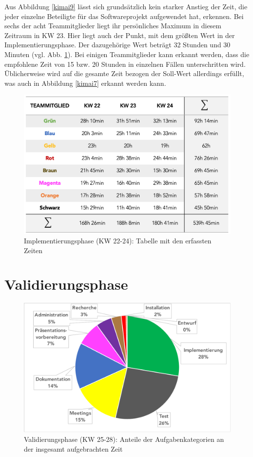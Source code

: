 \documentclass[../review_3.tex]{subfiles}
\begin{document}
Aus Abbildung \ref{kimai9} lässt sich grundsätzlich kein starker Anstieg der Zeit, die jeder einzelne Beteiligte für das Softwareprojekt aufgewendet hat, erkennen. Bei sechs der acht Teammitglieder liegt ihr persönliches Maximum in diesem Zeitraum in KW 23. Hier liegt auch der Punkt, mit dem größten Wert in der Implementierungsphase. Der dazugehörige Wert beträgt 32 Stunden und 30 Minuten (vgl. Abb. \ref{kimai11}).
Bei einigen Teammitglieder kann erkannt werden, dass die empfohlene Zeit von 15 bzw. 20 Stunden in einzelnen Fällen unterschritten wird. Üblicherweise wird auf die gesamte Zeit bezogen der Soll-Wert allerdings erfüllt, was auch in Abbildung \ref{kimai7} erkannt werden kann.

\begin{figure} [h]
    \centering
    \includegraphics[width = 0.8\linewidth]{img/kimai11.png}
    \caption{Implementierungsphase (KW 22-24): Tabelle mit den erfassten Zeiten}
    \label{kimai11}
\end{figure}

\section{Validierungsphase}
\begin{figure} [h]
    \centering
    \includegraphics[width = 0.9\linewidth, trim=10pt 10pt 10pt 2pt, clip]{img/KreisVal.pdf}
    \caption{Validierungsphase (KW 25-28): Anteile der Aufgabenkategorien an der insgesamt aufgebrachten Zeit}
    \label{kimai19}
\end{figure}
\end{document}
